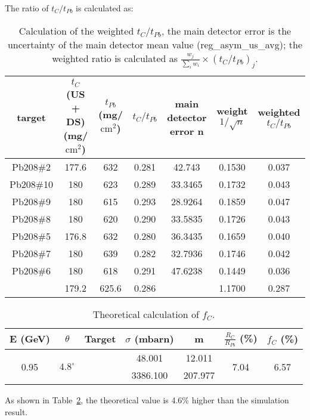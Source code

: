 The ratio of $t_C/t_{Pb}$ is calculated as:
\begin{table}[!h]
    \centering
    \begin{tabular}{c | c c c | c c c}
	\hline
	target	& \makecell{$t_C$ (US + DS) \\ (mg/$\mathrm{cm}^2$)} & \makecell{$t_{Pb}$ \\ (mg/$\mathrm{cm}^2$)}	
	& $t_C/t_{Pb}$  & \makecell{main detector \\ error n} & \makecell{weight \\ $1/\sqrt{n}$}    & \makecell{weighted \\ $t_C/t_{Pb}$} \\
	\hline
	Pb208\#2    & 177.6	& 632	& 0.281	& 42.743    & 0.1530	& 0.037 \\
	Pb208\#10   & 180	& 623	& 0.289	& 33.3465   & 0.1732	& 0.043	\\
	Pb208\#9    & 180	& 615   & 0.293 & 28.9264   & 0.1859   	& 0.047	\\
	Pb208\#8    & 180	& 620   & 0.290 & 33.5835   & 0.1726   	& 0.043	\\
	Pb208\#5    & 176.8	& 632   & 0.280 & 36.3435   & 0.1659   	& 0.040	\\
	Pb208\#7    & 180	& 639   & 0.282 & 32.7936   & 0.1746   	& 0.042	\\
	Pb208\#6    & 180	& 618   & 0.291 & 47.6238   & 0.1449   	& 0.036	\\
	\hline
		    & 179.2	& 625.6	& 0.286	&	    & 1.1700	& \color{red} 0.287 \\
	\hline                                                
    \end{tabular}
    \caption[carbon rate fraction]
    {Calculation of the weighted $t_C/t_{Pb}$, the main detector error is
    the uncertainty of the main detector mean value (reg\_asym\_us\_avg); the 
    weighted ratio is calculated as $\frac{w_j}{\sum_i w_i} \times \left( t_C/t_{Pb} \right)_j$.}
    \label{tab:ratio_of_area_density}
\end{table}

\begin{table}[!h]
    \centering
    \begin{tabular}{c c | c c c | c c}
	\hline
	E (GeV)   & $\theta$  & Target    & $\sigma$ (mbarn)    & m & $\frac{R_C}{R_{Pb}}$ (\%) & $f_C$ (\%)    \\
	\hline
	\multirow{2}{*}{0.95}	& \multirow{2}{*}{$4.8^\circ$}	& 
	      \C    & 48.001	& 12.011    & \multirow{2}{*}{7.04} & \multirow{2}{*}{6.57} \\
	\cline{3-5}
	&   & \Pb   & 3386.100	& 207.977   &	& \\
	\hline
    \end{tabular}
    \caption{Theoretical calculation of $f_C$. 
    }
    \label{tab:theoretical_value}
\end{table}
As shown in Table~\ref{tab:theoretical_value}, the theoretical value is 4.6\% higher than the simulation result.


